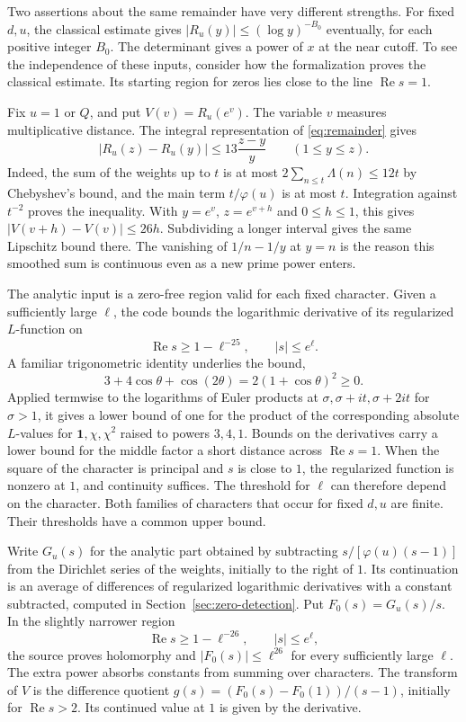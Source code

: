 \documentclass[11pt,letterpaper]{article}
\renewcommand{\Re}{\operatorname{Re}}
\begin{document}
Two assertions about the same remainder have very different strengths. For fixed \(d,u\), the classical estimate gives \(|R_u(y)|\le(\log y)^{-B_0}\) eventually, for each positive integer \(B_0\). The determinant gives a power of \(x\) at the near cutoff. To see the independence of these inputs, consider how the formalization proves the classical estimate. Its starting region for zeros lies close to the line \(\Re s=1\).

Fix \(u=1\) or \(Q\), and put \(V(v)=R_u(e^v)\). The variable \(v\) measures multiplicative distance. The integral representation of \eqref{eq:remainder} gives
\[
  |R_u(z)-R_u(y)|\le13\frac{z-y}{y}\qquad(1\le y\le z).
\]
Indeed, the sum of the weights up to \(t\) is at most \(2\sum_{n\le t}\Lambda(n)\le12t\) by Chebyshev's bound, and the main term \(t/\varphi(u)\) is at most \(t\). Integration against \(t^{-2}\) proves the inequality. With \(y=e^v\), \(z=e^{v+h}\) and \(0\le h\le1\), this gives \(|V(v+h)-V(v)|\le26h\). Subdividing a longer interval gives the same Lipschitz bound there. The vanishing of \(1/n-1/y\) at \(y=n\) is the reason this smoothed sum is continuous even as a new prime power enters.

The analytic input is a zero-free region valid for each fixed character. Given a sufficiently large \(\ell\), the code bounds the logarithmic derivative of its regularized \(L\)-function on
\[
       \Re s\ge 1-\ell^{-25},\qquad |s|\le e^\ell .
\]
A familiar trigonometric identity underlies the bound,
\[
  3+4\cos\theta+\cos(2\theta)=2(1+\cos\theta)^2\ge0 .
\]
Applied termwise to the logarithms of Euler products at \(\sigma,\sigma+it,\sigma+2it\) for \(\sigma>1\), it gives a lower bound of one for the product of the corresponding absolute \(L\)-values for \(\mathbf1,\chi,\chi^2\) raised to powers \(3,4,1\). Bounds on the derivatives carry a lower bound for the middle factor a short distance across \(\Re s=1\). When the square of the character is principal and \(s\) is close to \(1\), the regularized function is nonzero at \(1\), and continuity suffices. The threshold for \(\ell\) can therefore depend on the character. Both families of characters that occur for fixed \(d,u\) are finite. Their thresholds have a common upper bound.

Write \(G_u(s)\) for the analytic part obtained by subtracting \(s/[\varphi(u)(s-1)]\) from the Dirichlet series of the weights, initially to the right of \(1\). Its continuation is an average of differences of regularized logarithmic derivatives with a constant subtracted, computed in Section~\ref{sec:zero-detection}. Put \(F_0(s)=G_u(s)/s\). In the slightly narrower region
\[
      \Re s\ge1-\ell^{-26},\qquad |s|\le e^\ell ,
\]
the source proves holomorphy and \(|F_0(s)|\le\ell^{26}\) for every sufficiently large \(\ell\). The extra power absorbs constants from summing over characters. The transform of \(V\) is the difference quotient \(g(s)=(F_0(s)-F_0(1))/(s-1)\), initially for \(\Re s>2\). Its continued value at \(1\) is given by the derivative.
\end{document}
